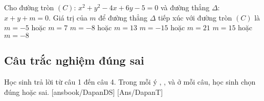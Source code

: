 \begin{ex}%
	Cho đường tròn $(C)$: $x^2+y^2-4x+6y-5=0$ và đường thẳng $\Delta$: $x+y+m=0$. Giá trị của $m$ để đường thẳng $\Delta$ tiếp xúc với đường tròn $(C)$ là
	\choice
	{\True$m=-5$ hoặc $m=7$}
	{$m=-8$ hoặc $m=13$}
	{$m=-15$ hoặc $m=21$}
	{$m=15$ hoặc $m=-8$}
\end{ex}




\subsection{Câu trắc nghiệm đúng sai}
Học sinh trả lời từ câu 1 đến câu 4.
Trong mỗi ý , ,  và  ở mỗi câu, học sinh chọn đúng hoặc sai.
\setcounter{ex}{0}
\LGexTF
{}[ansbook/DapanDS]
[Ans/DapanT]


